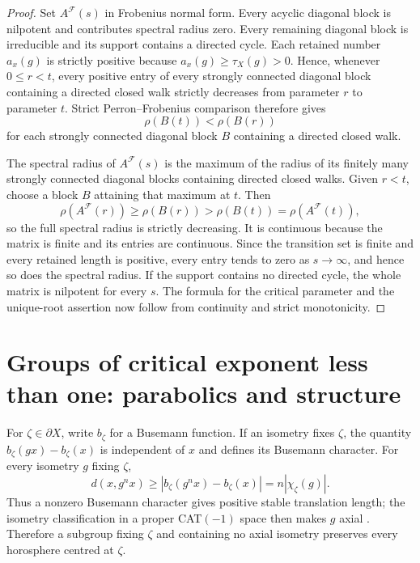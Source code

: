 \documentclass[11pt]{article}
\theoremstyle{definition}
\begin{document}
\begin{proof}
Set $A^{\mathcal F}(s)$ in Frobenius normal form.  Every acyclic diagonal block is nilpotent
and contributes spectral radius zero.  Every remaining diagonal block is irreducible and its
support contains a directed cycle.  Each retained number $a_x(g)$ is strictly positive because
$a_x(g)\ge\tau_X(g)>0$. Hence, whenever $0\le r<t$, every positive entry of every strongly connected diagonal block containing a directed closed
walk strictly decreases from parameter $r$ to parameter $t$.  Strict Perron--Frobenius
comparison therefore gives
\[
 \rho(B(t))<\rho(B(r))
\]
for each strongly connected diagonal block $B$ containing a directed closed walk.

The spectral radius of $A^{\mathcal F}(s)$ is the maximum of the radius of its finitely many
strongly connected diagonal blocks containing directed closed walks.  Given $r<t$, choose a block $B$ attaining that maximum at $t$.
Then
\[
 \rho(A^{\mathcal F}(r))\ge\rho(B(r))>
 \rho(B(t))=\rho(A^{\mathcal F}(t)),
\]
so the full spectral radius is strictly decreasing.  It is continuous because the matrix is
finite and its entries are continuous.  Since the transition set is finite and every retained
length is positive, every entry tends to zero as $s\to\infty$, and hence so does the spectral
radius.  If the support contains no directed cycle, the whole matrix is nilpotent for every
$s$.  The formula for the critical parameter and the unique-root assertion now follow from
continuity and strict monotonicity.
\end{proof}


\section{Groups of critical exponent less than one: parabolics and structure}
\label{sec:small-exponent}

For $\zeta\in\partial X$, write $b_\zeta$ for a Busemann function.  If an isometry fixes
$\zeta$, the quantity $b_\zeta(gx)-b_\zeta(x)$ is independent of $x$ and defines its
Busemann character.  For every isometry $g$ fixing $\zeta$,
\[
 d(x,g^n x)\ge |b_\zeta(g^n x)-b_\zeta(x)|
 =n|\chi_\zeta(g)|.
\]
Thus a nonzero Busemann character gives positive stable translation length; the isometry
classification in a proper CAT$(-1)$ space then makes $g$ axial
\cite[Chapter~II.6]{BridsonHaefliger1999}.  Therefore a subgroup fixing $\zeta$ and
containing no axial isometry preserves every horosphere centred at $\zeta$.
\end{document}
